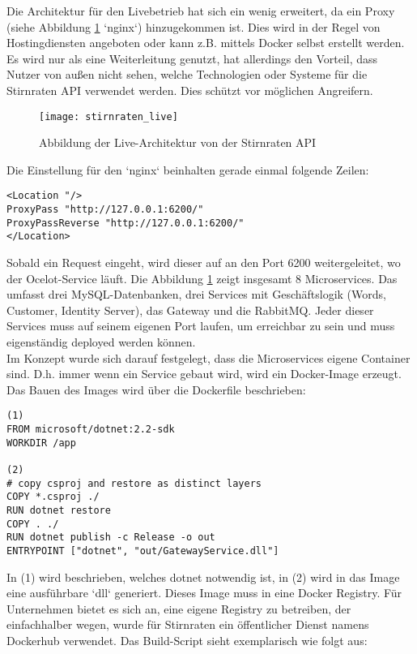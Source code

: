Die Architektur für den Livebetrieb hat sich ein wenig erweitert, da ein Proxy (siehe Abbildung \ref{fig:stirnraten_live} `nginx`) hinzugekommen ist. Dies wird in der Regel von Hostingdiensten angeboten oder kann z.B. mittels Docker selbst erstellt werden. Es wird nur als eine Weiterleitung genutzt, hat allerdings den Vorteil, dass Nutzer von außen nicht sehen, welche Technologien oder Systeme für die Stirnraten API verwendet werden. Dies schützt vor möglichen Angreifern.

\begin{figure}[ht]
	\centering
	\texttt{[image: stirnraten\_live]}
	\caption[Stirnraten Live Architektur] {Abbildung der Live-Architektur von der Stirnraten API}
	\label{fig:stirnraten_live}
\end{figure} 

Die Einstellung für den `nginx` beinhalten gerade einmal folgende Zeilen: 

\begin{verbatim}
<Location "/>
ProxyPass "http://127.0.0.1:6200/"
ProxyPassReverse "http://127.0.0.1:6200/"
</Location>
\end{verbatim}

Sobald ein Request eingeht, wird dieser auf an den Port 6200 weitergeleitet, wo der Ocelot-Service läuft. Die Abbildung \ref{fig:stirnraten_live} zeigt insgesamt 8 Microservices. Das umfasst drei MySQL-Datenbanken, drei Services mit Geschäftslogik (Words, Customer, Identity Server), das Gateway und die RabbitMQ. Jeder dieser Services muss auf seinem eigenen Port laufen, um erreichbar zu sein und muss eigenständig deployed werden können.\\

Im Konzept wurde sich darauf festgelegt, dass die Microservices eigene Container sind. D.h. immer wenn ein Service gebaut wird, wird ein Docker-Image erzeugt. Das Bauen des Images wird über die Dockerfile beschrieben: 

\begin{verbatim}
(1)
FROM microsoft/dotnet:2.2-sdk
WORKDIR /app

(2)
# copy csproj and restore as distinct layers
COPY *.csproj ./
RUN dotnet restore
COPY . ./
RUN dotnet publish -c Release -o out
ENTRYPOINT ["dotnet", "out/GatewayService.dll"]
\end{verbatim}

In (1) wird beschrieben, welches dotnet notwendig ist, in (2) wird in das Image eine ausführbare `dll` generiert. Dieses Image muss in eine Docker Registry. Für Unternehmen bietet es sich an, eine eigene Registry zu betreiben, der einfachhalber wegen, wurde für Stirnraten ein öffentlicher Dienst namens Dockerhub verwendet. Das Build-Script sieht exemplarisch wie folgt aus: 

